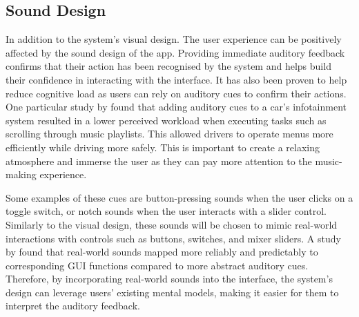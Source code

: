 \subsection{Sound Design}
In addition to the system’s visual design. The user experience can be positively affected by the sound design of the app. Providing immediate auditory feedback confirms that their action has been recognised by the system and helps build their confidence in interacting with the interface. It has also been proven to help reduce cognitive load as users can rely on auditory cues to confirm their actions. One particular study by \cite{jeon2015menu} found that adding auditory cues to a car’s infotainment system resulted in a lower perceived workload when executing tasks such as scrolling through music playlists. This allowed drivers to operate menus more efficiently while driving more safely. This is important to create a relaxing atmosphere and immerse the user as they can pay more attention to the music-making experience.

Some examples of these cues are button-pressing sounds when the user clicks on a toggle switch, or notch sounds when the user interacts with a slider control. Similarly to the visual design, these sounds will be chosen to mimic real-world interactions with controls such as buttons, switches, and mixer sliders. A study by \cite{sikora1995musical} found that real-world sounds mapped more reliably and predictably to corresponding GUI functions compared to more abstract auditory cues. Therefore, by incorporating real-world sounds into the interface, the system’s design can leverage users’ existing mental models, making it easier for them to interpret the auditory feedback.
